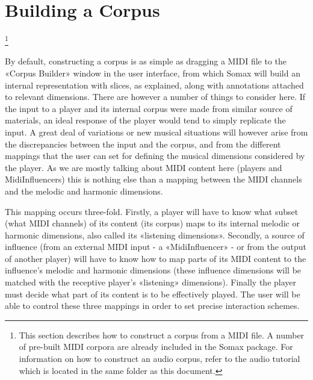 \chapter{Building a  Corpus} \footnote{This section describes how to construct a corpus from a MIDI file. A number of pre-built MIDI corpora are already included in the Somax package. For information on how to construct an audio corpus, refer to the audio tutorial which is located in the same folder as this document.}

By default, constructing a corpus is as simple as dragging a MIDI file to the «Corpus Builder» window in the user interface, from which Somax will build an internal representation with slices, as explained, along with annotations attached to relevant dimensions. There are however a number of things to consider here. If the input to a player and its internal corpus were made from similar source of materials, an ideal response of the player would tend to simply replicate the input. A great deal of variations or new musical situations will however arise from the discrepancies between the input and the corpus, and from the different mappings that the user can set for defining the musical dimensions considered by the player. As we are mostly talking about MIDI content here (players and MidiInfluencers) this is nothing else than a mapping between the MIDI channels and the melodic and harmonic dimensions.

This mapping occurs three-fold. Firstly, a player will have to know what subset (what MIDI channels) of its content (its corpus) maps to its internal melodic or harmonic dimensions, also called its «listening dimensions». Secondly, a source of influence (from an external MIDI input - a «MidiInfluencer» - or from the output of another player) will have to know how to map parts of its MIDI content to the influence’s melodic and harmonic dimensions (these influence dimensions will be matched with the receptive player’s «listening» dimensions). Finally the player must decide what part of its content is to be effectively played. The user will be able to control these three mappings in order to set precise interaction schemes.

